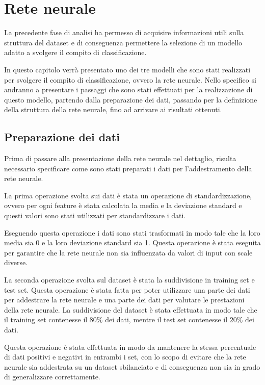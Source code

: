 \chapter{Rete neurale} \label{chp:reteNeurale}
La precedente fase di analisi ha permesso di acquisire informazioni utili sulla
struttura del dataset e di conseguenza permettere la selezione di un modello
adatto a svolgere il compito di classificazione.

In questo capitolo verrà presentato uno dei tre modelli che sono stati realizzati
per svolgere il compito di classificazione, ovvero la rete neurale. Nello
specifico si andranno a presentare i passaggi che sono stati effettuati per la
realizzazione di questo modello, partendo dalla preparazione dei dati, passando
per la definizione della struttura della rete neurale, fino ad arrivare ai
risultati ottenuti.
\section{Preparazione dei dati}
Prima di passare alla presentazione della rete neurale nel dettaglio, risulta
necessario specificare come sono stati preparati i dati per l'addestramento della
rete neurale.

La prima operazione svolta sui dati è stata un operazione di standardizzazione,
ovvero per ogni feature è stata calcolata la media e la deviazione standard e
questi valori sono stati utilizzati per standardizzare i dati.

Eseguendo questa operazione i dati sono stati trasformati in modo tale che la
loro media sia 0 e la loro deviazione standard sia 1. Questa operazione è stata
eseguita per garantire che la rete neurale non sia influenzata da valori di input
con scale diverse.

La seconda operazione svolta sul dataset è stata la suddivisione in training set
e test set. Questa operazione è stata fatta per poter utilizzare una parte dei
dati per addestrare la rete neurale e una parte dei dati per valutare le
prestazioni della rete neurale. La suddivisione del dataset è stata effettuata
in modo tale che il training set contenesse il $80\%$ dei dati, mentre il test
set contenesse il $20\%$ dei dati.

Questa operazione è stata effettuata in modo da mantenere la stessa percentuale
di dati positivi e negativi in entrambi i set, con lo scopo di evitare che la
rete neurale sia addestrata su un dataset sbilanciato e di conseguenza non sia
in grado di generalizzare correttamente.
